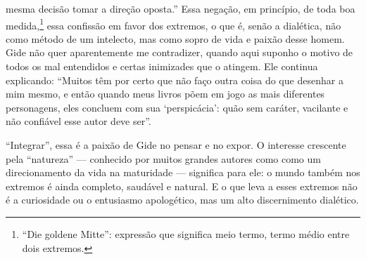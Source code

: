 mesma decisão tomar a direção oposta.'' Essa negação, em princípio, de
toda boa medida,\footnote{``Die goldene Mitte'': expressão que
  significa meio termo, termo médio entre dois extremos. \versal{[N. T.]}} essa
confissão em favor dos extremos, o que é, senão a dialética, não como
método de um intelecto, mas como sopro de vida e paixão desse homem.
Gide não quer aparentemente me contradizer, quando aqui suponho o motivo
de todos os mal entendidos e certas inimizades que o atingem. Ele
continua explicando: ``Muitos têm por certo que não faço outra coisa do
que desenhar a mim mesmo, e então quando meus livros põem em jogo as
mais diferentes personagens, eles concluem com sua `perspicácia': quão
sem caráter, vacilante e não confiável esse autor deve ser''.

``Integrar'', essa é a paixão de Gide no pensar e no expor. O interesse
crescente pela ``natureza'' --- conhecido por muitos grandes autores como
como um direcionamento da vida na maturidade --- significa para ele:
o mundo também nos extremos é ainda completo, saudável e natural. E o
que leva a esses extremos não é a curiosidade ou o entusiasmo
apologético, mas um alto discernimento dialético.

